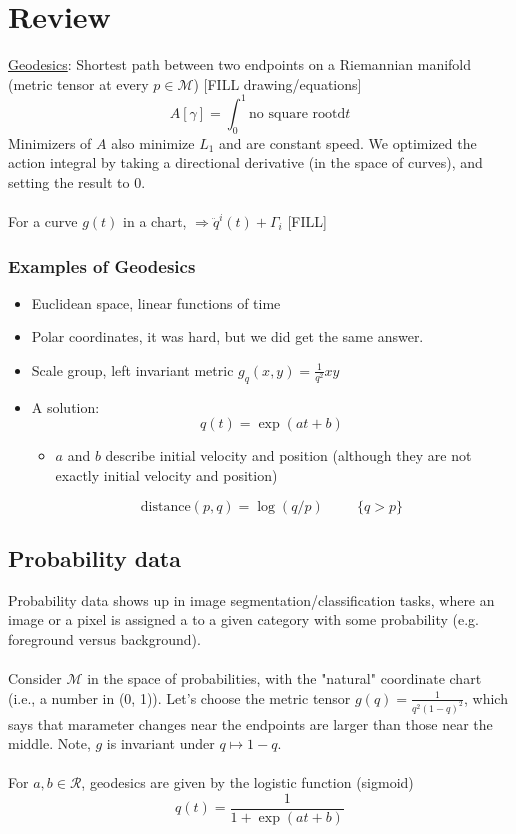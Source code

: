 \documentclass[10pt]{article}
\newcommand{\dd}{\text{d}}
\begin{document}
\section*{Review}
\underline{Geodesics}: Shortest path between two endpoints on a Riemannian manifold (metric tensor at every $p \in \mathcal{M}$)
[FILL drawing/equations]
\[A[\gamma] = \int_0^1 \text{no square root} \dd t\]
Minimizers of $A$ also minimize $L_1$ and are constant speed.  We optimized the action integral by taking a directional derivative (in the space of curves), and setting the result to 0.\\\\
For a curve $g(t)$ in a chart, $\Rightarrow \ddot{q}^i(t) + \Gamma_i$ [FILL]

\subsubsection*{Examples of Geodesics}
\begin{itemize}
	\item Euclidean space, linear functions of time
	\item Polar coordinates, it was hard, but we did get the same answer.
	\item Scale group, left invariant metric $g_q(x, y) = \frac{1}{q^2} xy$
	\item A solution:
    \[q(t) = \exp(at + b)\]
    \begin{itemize}
        \item $a$ and $b$ describe initial velocity and position (although they are not exactly initial velocity and position)
    \end{itemize}
    \[\text{distance}(p, q) = \log(q/p) \hspace{1cm}\{q > p\}\]
\end{itemize}

\subsection*{Probability data}
Probability data shows up in image segmentation/classification tasks, where an image or a pixel is assigned a to a given category with some probability (e.g. foreground versus background).\\\\
Consider $\mathcal{M}$ in the space of probabilities, with the "natural" coordinate chart (i.e., a number in (0, 1)).  Let's choose the metric tensor $g(q) = \frac{1}{q^2 (1 - q)^2}$, which says that marameter changes near the endpoints are larger than those near the middle.  Note, $g$ is invariant under $q \mapsto 1 - q$.\\\\
For $a, b \in \mathcal{R}$, geodesics are given by the logistic function (sigmoid)
\[q(t) = \frac{1}{1 + \exp(at + b)}\]
\end{document}
